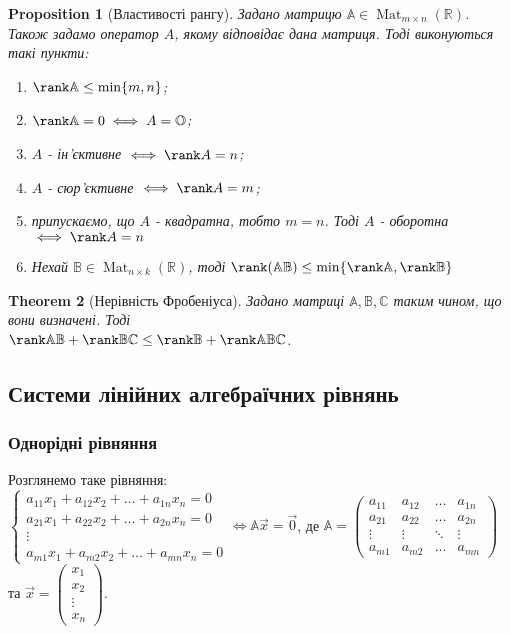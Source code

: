 \documentclass[a4paper, 10pt]{article}
\theoremstyle{theoremdd}
\newtheorem{theorem}{Theorem}[subsection]
\newtheorem{proposition}[theorem]{Proposition}
\DeclareMathOperator{\Mat}{Mat}
\begin{document}
\begin{proposition}[Властивості рангу]
Задано матрицю $\mathbb{A} \in \Mat_{m \times n}(\mathbb{R})$. Також задамо оператор $A$, якому відповідає дана матриця. Тоді виконуються такі пункти:
\begin{enumerate}[nosep, wide=0pt, label={\arabic*)}]
\item $\rank \mathbb{A} \leq \min \{m,n\}$;
\item $\rank \mathbb{A} = 0 \iff A = \mathbb{O}$;
\item $A$ - ін'єктивне $\iff \rank A = n$;
\item $A$ - сюр'єктивне $\iff \rank A = m$;
\item припускаємо, що $A$ - квадратна, тобто $m = n$. Тоді $A$ - оборотна $\iff \rank A = n$
\item Нехай $\mathbb{B} \in \Mat_{n \times k}(\mathbb{R})$, тоді $\rank (\mathbb{A} \mathbb{B}) \leq \min \{ \rank \mathbb{A}, \rank \mathbb{B} \}$
\end{enumerate}
\end{proposition}

\begin{theorem}[Нерівність Фробеніуса]
Задано матриці $\mathbb{A},\mathbb{B}, \mathbb{C}$ таким чином, що вони визначені. Тоді\\
$\rank \mathbb{A} \mathbb{B} + \rank \mathbb{B} \mathbb{C} \leq \rank \mathbb{B} + \rank \mathbb{A} \mathbb{B} \mathbb{C}$.
\end{theorem}

\subsection{Системи лінійних алгебраїчних рівнянь}
\subsubsection*{Однорідні рівняння}
Розглянемо таке рівняння:\\
$\begin{cases}
a_{11}x_1 + a_{12}x_2 + \dots + a_{1n}x_n = 0\\
a_{21}x_1 + a_{22}x_2 + \dots + a_{2n}x_n = 0\\
\vdots \\
a_{m1}x_1 + a_{m2}x_2 + \dots + a_{mn}x_n = 0
\end{cases} \iff \mathbb{A} \vec{x} = \vec{0}
$,
де $\mathbb{A} = \begin{pmatrix}
a_{11} & a_{12} & \dots & a_{1n} \\
a_{21} & a_{22} & \dots & a_{2n} \\
\vdots & \vdots & \ddots & \vdots \\
a_{m1} & a_{m2} & \dots & a_{mn}
\end{pmatrix}$ та $\vec{x} = \begin{pmatrix}
x_1 \\ x_2 \\ \vdots \\ x_n
\end{pmatrix}$.
\end{document}
